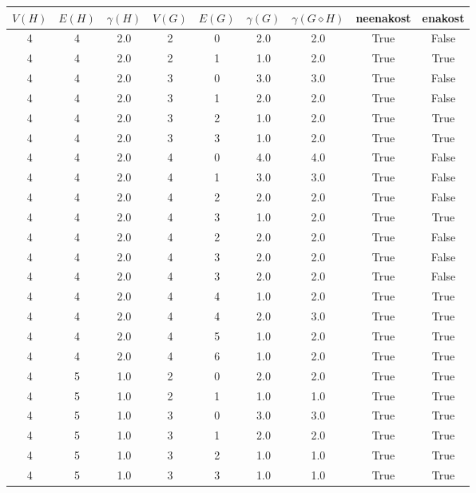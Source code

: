 \documentclass[a4paper,12pt]{article}
\begin{document}
\begin{center}
    \begin{tabular}{ c c c | c c c | c | c | c}
        $V(H)$ & $E(H)$ & $\gamma(H)$ & $V(G)$ & $E(G)$ & $\gamma(G)$ & $\gamma(G \diamond H)$ & neenakost & enakost \\
        \hline
        4 & 4 & 2.0 & 2 & 0 & 2.0 & 2.0 & True & False    \\
        4 & 4 & 2.0 & 2 & 1 & 1.0 & 2.0 & True & True     \\
        4 & 4 & 2.0 & 3 & 0 & 3.0 & 3.0 & True & False    \\
        4 & 4 & 2.0 & 3 & 1 & 2.0 & 2.0 & True & False    \\
        4 & 4 & 2.0 & 3 & 2 & 1.0 & 2.0 & True & True     \\
        4 & 4 & 2.0 & 3 & 3 & 1.0 & 2.0 & True & True     \\
        4 & 4 & 2.0 & 4 & 0 & 4.0 & 4.0 & True & False    \\
        4 & 4 & 2.0 & 4 & 1 & 3.0 & 3.0 & True & False    \\
        4 & 4 & 2.0 & 4 & 2 & 2.0 & 2.0 & True & False    \\
        4 & 4 & 2.0 & 4 & 3 & 1.0 & 2.0 & True & True     \\
        4 & 4 & 2.0 & 4 & 2 & 2.0 & 2.0 & True & False    \\
        4 & 4 & 2.0 & 4 & 3 & 2.0 & 2.0 & True & False    \\
        4 & 4 & 2.0 & 4 & 3 & 2.0 & 2.0 & True & False    \\
        4 & 4 & 2.0 & 4 & 4 & 1.0 & 2.0 & True & True     \\
        4 & 4 & 2.0 & 4 & 4 & 2.0 & 3.0 & True & True     \\
        4 & 4 & 2.0 & 4 & 5 & 1.0 & 2.0 & True & True     \\
        4 & 4 & 2.0 & 4 & 6 & 1.0 & 2.0 & True & True     \\
        4 & 5 & 1.0 & 2 & 0 & 2.0 & 2.0 & True & True     \\
        4 & 5 & 1.0 & 2 & 1 & 1.0 & 1.0 & True & True     \\
        4 & 5 & 1.0 & 3 & 0 & 3.0 & 3.0 & True & True     \\
        4 & 5 & 1.0 & 3 & 1 & 2.0 & 2.0 & True & True     \\
        4 & 5 & 1.0 & 3 & 2 & 1.0 & 1.0 & True & True     \\
        4 & 5 & 1.0 & 3 & 3 & 1.0 & 1.0 & True & True     \\

\end{tabular}
\end{center}
\end{document}
